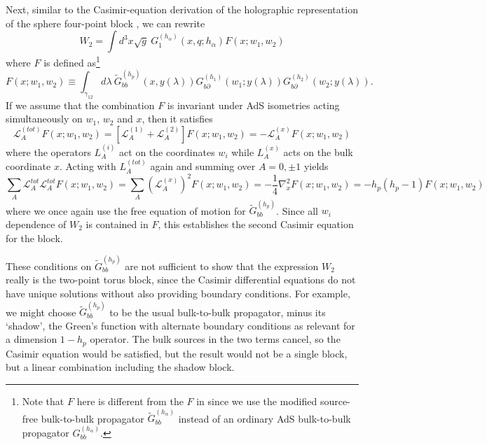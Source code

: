 \documentclass[12pt]{article}
\newcommand{\calL}{\mathcal{L}}
\def\p{\partial}
\begin{document}
Next, similar to the Casimir-equation derivation of the holographic representation of the sphere four-point block \cite{Hijano:2015zsa}, we can rewrite
\begin{equation}
W_2 = \int \! d^3x \sqrt{g}  \:
G^{(h_\alpha)}_1(x,q;h_\alpha)
F(x;w_1,w_2)
\end{equation}
where $F$ is defined as\footnote{Note that $F$ here is different from the $F$ in \cite{Hijano:2015zsa} since we use the modified source-free bulk-to-bulk propagator $\tilde{G}_{bb}^{(h_\alpha)}$ instead of an ordinary AdS bulk-to-bulk propagator $G_{bb}^{(h_\alpha)}$.}
\begin{equation}
F(x;w_1,w_2)\equiv \int_{\gamma_{12}} d \lambda\: \tilde{G}^{(h_p)}_{bb}(x,y(\lambda))  G^{(h_1)}_{b\p}(w_1;y(\lambda)) G^{(h_2)}_{b\p}(w_2;y(\lambda)).
\end{equation}
If we assume that the combination $F$ is invariant under AdS isometries acting simultaneously on $w_1$, $w_2$ and $x$, then it satisfies
\begin{equation}
\calL_A^{(tot)}F(x;w_1,w_2)
=\left[
\calL_A^{(1)}
+\calL_A^{(2)}
\right] F(x;w_1,w_2)
=- \calL_A^{(x)} F(x;w_1,w_2)
\end{equation}
where the operators $L_A^{(i)}$ act on the coordinates $w_i$ while $L_A^{(x)}$ acts on the bulk coordinate $x$. Acting with $L_A^{(tot)}$ again and summing over $A=0,\pm 1$ yields
\begin{equation*}
\sum_A \calL_A^{tot}\calL_A^{tot} F(x;w_1,w_2)
=\sum_A\left(\calL_A^{(x)}\right)^2 F(x;w_1,w_2)
=-\frac{1}{4} \nabla_x^2 F(x;w_1,w_2) =-h_p(h_p-1) F(x;w_1,w_2)
\end{equation*}
where we once again use the free equation of motion for $\tilde{G}^{(h_p)}_{bb}$. Since all $w_i$ dependence of $W_2$ is contained in $F$, this establishes the second Casimir equation for the block.

These conditions on $\tilde{G}^{(h_p)}_{bb}$ are not sufficient to show that the expression $W_2$ really is the two-point torus block, since the Casimir differential equations do not have unique solutions without also providing boundary conditions. For example, we might choose $\tilde{G}^{(h_p)}_{bb}$ to be the usual bulk-to-bulk propagator, minus its `shadow', the Green's function with alternate boundary conditions as relevant for a dimension $1-h_p$ operator. The bulk sources in the two terms cancel, so the Casimir equation would be satisfied, but the result would not be a single block, but a linear combination including the shadow block.
\end{document}
